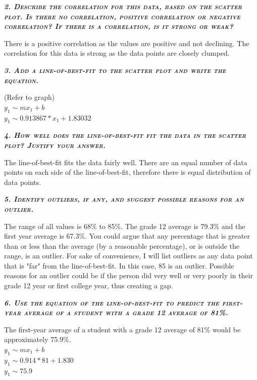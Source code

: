 \documentclass{article}
\begin{document}
\newpage

\textbf{\emph{\textsc{2. Describe the correlation for this data, based on the scatter plot. Is there no correlation, positive correlation or negative correlation? If there is a correlation, is it strong or weak?}}}

There is a positive correlation as the values are positive and not declining. The correlation for this data is strong as the data points are closely clumped. 

\textbf{\emph{\textsc{3. Add a line-of-best-fit to the scatter plot and write the equation.}}}

(Refer to graph) \\
$y_{1}\mathtt{\sim}mx_{1}+b$ \\
$y_{1}\mathtt{\sim}0.913867*x_{1}+1.83032$

\textbf{\emph{\textsc{4. How well does the line-of-best-fit fit the data in the scatter plot? Justify your answer.}}}

The line-of-best-fit fits the data fairly well. There are an equal number of data points on each side of the line-of-best-fit, therefore there is equal distribution of data points.

\textbf{\emph{\textsc{5. Identify outliers, if any, and suggest possible reasons for an outlier.}}}

The range of all values is 68\% to 85\%. The grade 12 average is 79.3\% and the first year average is 67.3\%. You could argue that any percentage that is greater than or less than the average (by a reasonable percentage), or is outside the range, is an outlier. For sake of convenience, I will list outliers as any data point that is "far" from the line-of-best-fit. In this case, 85 is an outlier. Possible reasons for an outlier could be if the person did very well or very poorly in their grade 12 year or first college year, thus creating a gap.

\textbf{\emph{\textsc{6. Use the equation of the line-of-best-fit to predict the first-year average of a student with a grade 12 average of 81\%.}}}

The first-year average of a student with a grade 12 average of 81\% would be approximately 75.9\%. \\
$y_{1}\mathtt{\sim}mx_{1}+b$ \\
$y_{1}\mathtt{\sim}0.914*81+1.830$ \\
$y_{1}\mathtt{\sim}75.9$ \\

\newpage
\end{document}
